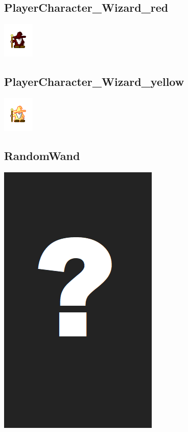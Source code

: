 \documentclass[a4paper,12pt]{scrartcl}
\begin{document}
	\subsection{PlayerCharacter\_Wizard\_red}
	\begin{center}\includegraphics{Prog2_EA_V2/Art/PlayerCharacter_Wizard_red.png}\end{center}
	\subsection{PlayerCharacter\_Wizard\_yellow}
	\begin{center}\includegraphics{Prog2_EA_V2/Art/PlayerCharacter_Wizard_yellow.png}\end{center}
	\subsection{RandomWand}
	\begin{center}\includegraphics{Prog2_EA_V2/Art/RandomWand.png}\end{center}
\end{document}
